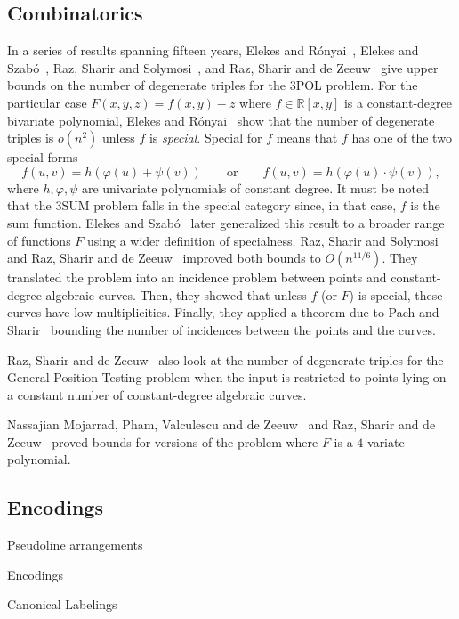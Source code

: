 

\subsection{Combinatorics}

In a series of results spanning fifteen years,
Elekes and Rónyai~\cite{ER00},
Elekes and Szabó~\cite{ES12},
Raz, Sharir and Solymosi~\cite{RSS14}, and
Raz, Sharir and de Zeeuw~\cite{RSZ15}
give upper bounds on the number of degenerate triples for the 3POL problem.
%
For the particular case $F(x,y,z) = f(x,y) - z$ where $f \in \mathbb{R}[x,y]$
is a constant-degree bivariate polynomial, Elekes and Rónyai~\cite{ER00} show
that the number of degenerate triples is $o(n^2)$ unless $f$ is
\emph{special}. Special for $f$ means that $f$ has one of the two special forms
\begin{displaymath}
f(u,v)=h(\varphi(u)+\psi(v))
\qquad
\text{or}
\qquad
f(u,v)=h(\varphi(u)\cdot\psi(v)),
\end{displaymath}
where $h,\varphi,\psi$ are univariate polynomials of constant degree.
It must be noted that the 3SUM problem falls in the special category since, in
that case, \( f \) is the sum function.
%
Elekes and Szabó~\cite{ES12} later generalized this result to a broader range
of functions $F$ using a wider definition of specialness.
%
Raz, Sharir and Solymosi~\cite{RSS14} and Raz, Sharir and de Zeeuw~\cite{RSZ15}
improved both bounds to $O(n^{11/6})$.
%
They translated the problem into an incidence problem between points and
constant-degree algebraic curves. Then, they showed that unless $f$ (or $F$) is
special, these curves have low multiplicities. Finally, they applied a theorem
due to Pach and Sharir~\cite{PS98} bounding the number of incidences between
the points and the curves.
%


Raz, Sharir and de Zeeuw~\cite{RSZ15} also look at the number of degenerate
triples for the General Position Testing problem when the input is restricted
to points lying on a constant number of constant-degree algebraic curves.
%


Nassajian Mojarrad, Pham, Valculescu and de Zeeuw~\cite{MPVd16} and
Raz, Sharir and de Zeeuw~\cite{RSZ16} proved bounds for versions of the
problem where $F$ is a $4$-variate polynomial.


\subsection{Encodings}

Pseudoline arrangements

Encodings

Canonical Labelings
